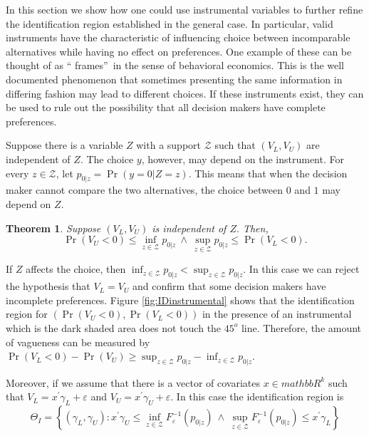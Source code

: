 \documentclass[reqno]{article}
\newtheorem{theorem}{Theorem}
\begin{document}
In this section we show how one could use instrumental variables to further
refine the identification region established in the general case. In
particular, valid instruments have the characteristic of influencing choice
between incomparable alternatives while having no effect on preferences. One
example of these can be thought of as \textquotedblleft
frames\textquotedblright\ in the sense of behavioral economics. This is the
well documented phenomenon that sometimes presenting the same information in
differing fashion may lead to different choices. If these instruments exist,
they can be used to rule out the possibility that all decision makers have
complete preferences.

Suppose there is a variable $Z$ with a support $\mathcal{Z}$ such that $%
\left( V_{L},V_{U}\right) $ are independent of $Z$. The choice $y$, however,
may depend on the instrument. For every $z\in \mathcal{Z}$, let $p_{0|z}=\Pr
\left( y=0|Z=z\right) $. This means that when the decision maker cannot
compare the two alternatives, the choice between $0$ and $1$ may depend on $%
Z $.

\begin{theorem}
Suppose $\left( V_{L},V_{U}\right) $ is independent of $Z.$ Then,%
\begin{equation*}
\Pr \left( V_{U}<0\right) \leq \inf_{z\in \mathcal{Z}}p_{0|z}\ \wedge \
\sup_{z\in \mathcal{Z}}p_{0|z}\leq \Pr \left( V_{L}<0\right) .
\end{equation*}
\end{theorem}

If $Z$ affects the choice, then $\inf_{z\in \mathcal{Z}}p_{0|z}<\sup_{z\in 
\mathcal{Z}}p_{0|z}$. In this case we can reject the hypothesis that $%
V_{L}=V_{U}$ and confirm that some decision makers have incomplete
preferences. Figure \ref{fig:IDinstrumental} shows that the identification
region for $\left( \Pr \left( V_{U}<0\right) ,\Pr \left( V_{L}<0\right)
\right) $ in the presence of an instrumental which is the dark shaded area
does not touch the $45^{o}$ line. Therefore, the amount of vagueness can be
measured by $\Pr \left( V_{L}<0\right) -\Pr \left( V_{U}\right) \geq
\sup_{z\in \mathcal{Z}}p_{0|z}-\inf_{z\in \mathcal{Z}}p_{0|z}$.


Moreover, if we assume that there is a vector of covariates $x\in mathbb{R}^{k}$ such that $V_{L}=x^{\prime }\gamma _{L}+\varepsilon $ and $V_{U}=x^{\prime }\gamma _{U}+\varepsilon $. In this case the identification region is 
\begin{equation*}
\Theta _{I}=\left\{ \left( \gamma _{L},\gamma _{U}\right) :x^{\prime }\gamma
_{U}\leq \inf_{z\in \mathcal{Z}}F_{\varepsilon }^{-1}(p_{0|z})\ \wedge \
\sup_{z\in \mathcal{Z}}F_{\varepsilon }^{-1}(p_{0|z})\leq x^{\prime }\gamma
_{L}\right\}
\end{equation*}
\end{document}
